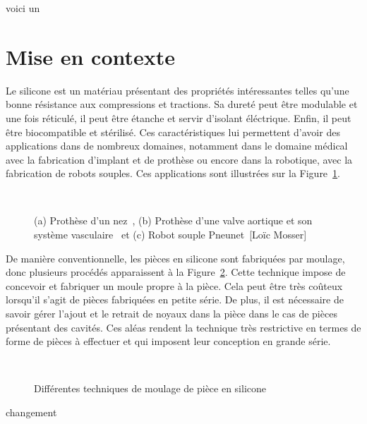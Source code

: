 \documentclass[11pt,a4paper]{article}
\begin{document}
voici un 

\section*{Mise en contexte}
    Le silicone est un matériau présentant des propriétés intéressantes telles qu'une bonne résistance aux compressions et tractions. Sa dureté peut être modulable et une fois réticulé, il peut être étanche et servir d'isolant éléctrique. Enfin, il peut être biocompatible et stérilisé. Ces caractéristiques lui permettent d'avoir des applications dans de nombreux domaines, notamment dans le domaine médical avec la fabrication d'implant et de prothèse ou encore dans la robotique, avec la fabrication de robots souples. Ces applications sont illustrées sur la Figure~\ref{fig:applications}. 

    \begin{figure}[H]
        \centering
        \def\svgwidth{0.5\columnwidth}
        \caption{(a) Prothèse d'un nez~\cite{zare2021silicone}, (b) Prothèse d'une valve aortique et son système vasculaire~\cite{coulter2019bioinspired} et (c) Robot souple Pneunet~[Loïc Mosser]}~\label{fig:applications}
    \end{figure}
    
    De manière conventionnelle, les pièces en silicone sont fabriquées par moulage, donc plusieurs procédés apparaissent à la Figure~\ref{fig:moulage}. Cette technique impose de concevoir et fabriquer un moule propre à la pièce. Cela peut être très coûteux lorsqu'il s'agit de pièces fabriquées en petite série. De plus, il est nécessaire de savoir gérer l'ajout et le retrait de noyaux dans la pièce dans le cas de pièces présentant des cavités. Ces aléas rendent la technique très restrictive en termes de forme de pièces à effectuer et qui imposent leur conception en grande série.

    \begin{figure}[H]
        \centering
        \def\svgwidth{\columnwidth}
        \caption{Différentes techniques de moulage de pièce en silicone}~\label{fig:moulage}
    \end{figure}

changement
\end{document}
